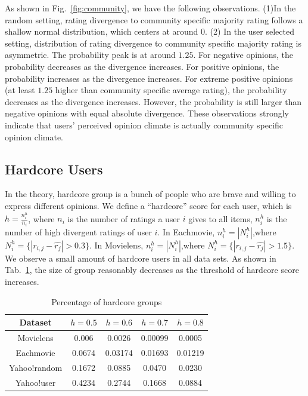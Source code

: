 \documentclass{sig-alternate}
\begin{document}
As shown in Fig.~\ref{fig:community}, we have the following observations. (1)In the random setting, rating divergence to community specific majority rating follows a shallow normal distribution, which centers at around $0$.  (2) In the user selected setting, distribution of rating divergence to community specific majority rating is asymmetric. The probability peak is at around $1.25$. For negative opinions, the probability decreases as the divergence increases. For positive opinions, the probability increases as the divergence increases. For extreme positive opinions (at least $1.25$ higher than community specific average rating), the probability decreases as the divergence increases. However, the probability is still larger than negative opinions with equal absolute divergence. These observations strongly indicate that users' perceived opinion climate is actually community specific opinion climate.

\subsection{Hardcore Users}

In the theory, hardcore group is a bunch of people who are brave and willing to express different opinions. We define a ``hardcore'' score for each user, which is $h=\frac{n^h_i}{n_i}$, where $n_i$ is the number of ratings a user $i$ gives to all items, $n^h_i$ is the number of high divergent ratings of user $i$. In Eachmovie, $n^h_i=|N^h_i|$,where $N^h_i=\{|r_{i,j}-\hat{r_{j}}|>0.3\}$. In Movielens, $n^h_i=|N^h_i|$,where $N^h_i=\{|r_{i,j}-\hat{r_{j}}|>1.5\}$.   We observe a small amount of hardcore users in all data sets. As shown in Tab.~\ref{tab:hardcore}, the size of group reasonably decreases as the threshold of hardcore score increases.

\begin{table}[htbp]
\centering
\caption{Percentage of hardcore groups}\label{tab:hardcore}
\centering
\begin{tabular}{|c|c|c|c|c|}
\hline
Dataset & $h=0.5$ & $h=0.6$ & $h=0.7$ & $h=0.8$ \\\hline\hline
Movielens & 0.006	 & 0.0026 &	0.00099 &	0.0005 \\\hline
Eachmovie & 0.0674 &	0.03174 &	0.01693 &	0.01219\\\hline
Yahoo!random & 0.1672& 0.0885& 0.0470& 0.0230\\\hline
Yahoo!user & 0.4234 &0.2744 & 0.1668 & 0.0884\\\hline
\end{tabular}
\end{table}
\end{document}
